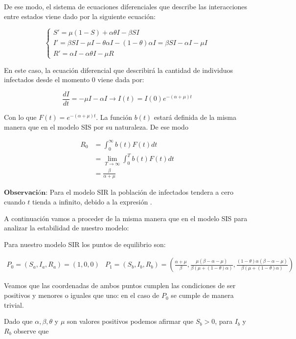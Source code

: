 De ese modo, el sistema de ecuaciones diferenciales que describe las interacciones entre estados viene dado por la siguiente ecuación:

\begin{equation}
\left\{
\begin{array}{l}
S' = \mu(1 - S) + \alpha\theta I - \beta S I \\
I' = \beta S I - \mu I - \theta\alpha I - (1 - \theta)\alpha I = \beta S I - \alpha I - \mu I \\
R' = \alpha I - \alpha\theta I - \mu R
\end{array}
\right.
\end{equation}

En este caso, la ecuación diferencial que describirá la cantidad de individuos infectados desde el momento 0 viene dada por:

$$\frac{dI}{dt}=-\mu I - \alpha I \longrightarrow I(t)=I(0)e^{-(\alpha+\mu)t}$$

Con lo que $F(t)=e^{-(\alpha+\mu)t}$. La función $b(t)$ estará definida de la misma manera que en el modelo SIS por su naturaleza. De ese modo 

\begin{align}
R_0 &= \int_0^\infty b(t)F(t) dt \\
&= \lim_{T\to\infty} \int_0^T b(t)F(t) dt \\
&= \frac{\beta}{\alpha+\mu}
\end{align}

$\textbf{Observación:}$ Para el modelo SIR la población de infectados tendera a cero cuando $t$ tienda a infinito, debido a la expresión .

A continuación vamos a proceder de la misma manera que en el modelo SIS para analizar la estabilidad de nuestro modelo:

Para nuestro modelo SIR los puntos de equilibrio son:

$$\begin{array}{cc}
P_0=(S_a,I_a,R_a)=(1,0,0) & P_1=(S_b,I_b,R_b)=\left(\frac{\alpha+\mu}{\beta},\frac{\mu(\beta-\alpha-\mu)}{\beta(\mu+(1-\theta)\alpha)},\frac{(1-\theta)\alpha(\beta-\alpha-\mu)}{\beta(\mu+(1-\theta)\alpha)}\right)
\end{array}$$

Veamos que las coordenadas de ambos puntos cumplen las condiciones de ser positivos y menores o iguales que uno: en el caso de $P_0$ se cumple de manera trivial.

Dado que $\alpha,\beta,\theta$ y $\mu$ son valores positivos podemos afirmar que $S_b>0$, para $I_b$ y $R_b$ observe que 

